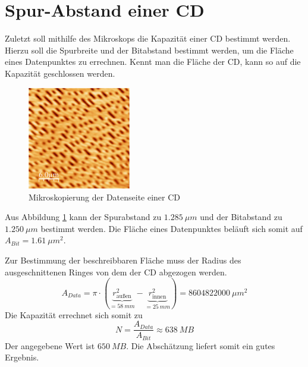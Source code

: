     \section{Spur-Abstand einer CD}

Zuletzt soll mithilfe des Mikroskops die Kapazität einer CD bestimmt werden. Hierzu
soll die Spurbreite und der Bitabstand bestimmt werden, um die Fläche eines 
Datenpunktes zu errechnen. Kennt man die Fläche der CD, kann so auf die Kapazität 
geschlossen werden. \par
\begin{figure}[h]
    \centering
    \includegraphics[width=0.4\textwidth]{Mess/cd.pdf}
    \caption{Mikroskopierung der Datenseite einer CD}
    \label{cd}
\end{figure}
Aus Abbildung \ref{cd} kann der Spurabstand zu $\SI{1,285}{\mu m}$ und der 
Bitabstand zu $\SI{1,250}{\mu m}$ bestimmt werden. Die Fläche eines Datenpunktes
beläuft sich somit auf $A_{Bit} = \SI{1,61}{\mu m^2}$. \par
Zur Bestimmung der beschreibbaren Fläche muss der Radius des ausgeschnittenen
Ringes von dem der CD abgezogen werden. 
\[
    A_{Data} = \pi \cdot \left( \underset{=\SI{58}{mm}}{\underbrace{r_{\text{außen}}^2}}
    - \underset{=\SI{25}{mm}}{\underbrace{r_{\text{innen}}^2 }} \right)
    = \SI{8604822000}{\mu m^2}
\]
Die Kapazität errechnet sich somit zu
\[
    N = \frac{A_{Data}}{A_{Bit}} \approx \SI{638}{MB}
\]
Der angegebene Wert ist $\SI{650}{MB}$. Die Abschätzung liefert somit ein gutes Ergebnis.
